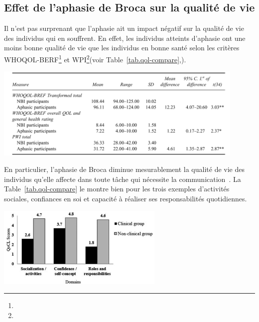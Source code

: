 \subsection{Effet de l'aphasie de Broca sur la qualité de vie}

Il n'est pas surprenant que l'aphasie ait un impact négatif sur la qualité de vie des individus qui en souffrent.
En effet, les individus atteints d'aphasie ont une moins bonne qualité de vie que les individus en bonne santé
selon les critères WHOQOL-BERF\footnote{} 
et WPI\footnote{}(voir Table~\ref{tab.qol-compare},).

\begin{table}[hbt]
    \centering
    \includegraphics[width=12cm]{assets/images/qol.png}
    \caption[Comparaison de la qualité de vie chez les individus saints et ceux qui souffrent d'une aphasie.]%
    {Comparaison de la qualité de vie chez les individus saints et ceux qui souffrent d'une aphasie~\cite{Ross_Wertz_2010}.}
    \label{tab.qol-compare}
\end{table}



En particulier, l'aphasie de Broca diminue mesurablement la qualité de vie des individus qu'elle affecte
dans toute tâche qui nécessite la communication~\cite{Pallavi_Perumal_Krupa_2018}. 
La Table~\ref{tab.qol-compare} le montre bien pour les trois exemples d'activités sociales, confiances en soi
et capacité à réaliser ses responsabilités quotidiennes.

\begin{table}[hbt]
    \centering
    \includegraphics[width=8cm]{assets/images/qocl.png}
    \caption[Comparaison de la qualité de vie de communication chez les individus saints et ceux qui souffrent de l'aphasie de Broca.]%
    {Comparaison de la qualité de vie de communication chez les individus saints et ceux qui souffrent de l'aphasie de Broca~\cite{Pallavi_Perumal_Krupa_2018}.}
    \label{tab.qocl-compare}
\end{table}
